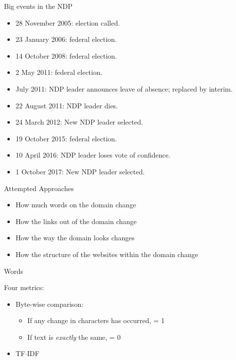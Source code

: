 \documentclass[10pt]{beamer}
\begin{document}
\begin{frame}{Big events in the NDP}

\begin{itemize}
\item 28 November 2005: election called.
\item 23 January 2006: federal election.
\item 14 October 2008: federal election.
\item 2 May 2011: federal election.
\item July 2011: NDP leader announces leave of absence; replaced by interim.
\item 22 August 2011: NDP leader dies.
\item 24 March 2012: New NDP leader selected.
\item 19 October 2015: federal election.
\item 10 April 2016: NDP leader loses vote of confidence.
\item 1 October 2017: New NDP leader selected.
\end{itemize}

\end{frame}

\begin{frame}{Attempted Approaches}
\Large
\begin{itemize}
\itemsep1.0em
\item How much words on the domain change
\item How the links out of the domain change
\item How the way the domain looks changes
\item How the structure of the websites within the domain change
\end{itemize}
\end{frame}

\begin{frame}{Words}

\LARGE Four metrics:
\begin{itemize}
\large\item Byte-wise comparison:
\begin{itemize}
\item If any change in characters has occurred, = 1
\item If text is \textit{exactly} the same, = 0
\end{itemize}
\item TF$\cdot$IDF 
\end{itemize}

\end{frame}
\end{document}
